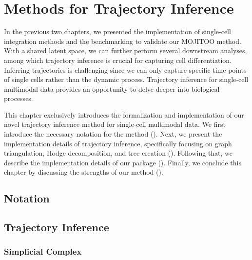 %
\chapter{Methods for Trajectory Inference}
\label{chapter:methods_TI}
\graphicspath{{chapter5/figs}}

In the previous two chapters, we presented the implementation of single-cell integration methods and the benchmarking to validate our MOJITOO method. With a shared latent space, we can further perform several downstream analyses, among which trajectory inference is crucial for capturing cell differentiation. Inferring trajectories is challenging since we can only capture specific time points of single cells rather than the dynamic process. Trajectory inference for single-cell multimodal data provides an opportunity to delve deeper into biological processes.

This chapter exclusively introduces the formalization and implementation of our novel trajectory inference method for single-cell multimodal data. We first introduce the necessary notation for the method (). Next, we present the implementation details of trajectory inference, specifically focusing on graph triangulation, Hodge decomposition, and tree creation (). Following that, we describe the implementation details of our package (). Finally, we conclude this chapter by discussing the strengths of our method ().


\section{Notation}
\label{TI_methods:notation}

\section{Trajectory Inference}
\label{TI_methods:TI}

\subsection{Simplicial Complex}

